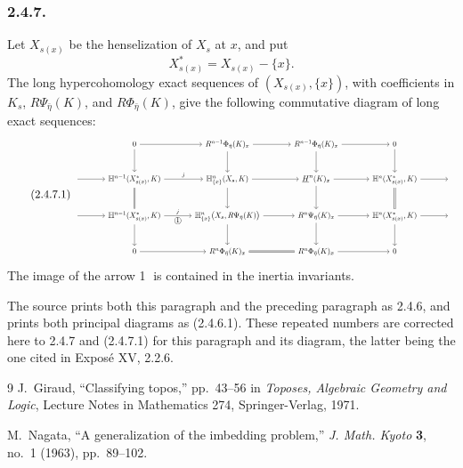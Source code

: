 \subsubsection*{2.4.7.}
Let $X_{s(x)}$ be the henselization of $X_s$ at $x$, and put
\[
X^*_{s(x)}=X_{s(x)}-\{x\}.
\]
The long hypercohomology exact sequences of
$(X_{s(x)},\{x\})$, with coefficients in $K_s$,
$R\Psi_{\bar\eta}(K)$, and $R\Phi_{\bar\eta}(K)$, give the following
commutative diagram of long exact sequences:
\begin{equation}\tag{2.4.7.1}
\resizebox{\textwidth}{!}{%
\begin{tikzcd}[ampersand replacement=\&, column sep=large, row sep=large]
{}
  \& 0 \arrow[r] \arrow[d]
  \& R^{n-1}\Phi_{\bar\eta}(K)_x \arrow[r] \arrow[d]
  \& R^{n-1}\Phi_{\bar\eta}(K)_x \arrow[r] \arrow[d]
  \& 0 \arrow[d]
  \& {} \\
{} \arrow[r]
  \& \mathbb H^{n-1}(X^*_{s(x)},K)
     \arrow[r, "j"] \arrow[d, equal]
  \& \mathbb H^n_{\{x\}}(X_s,K) \arrow[r] \arrow[d]
  \& \underline{H}^{n}(K)_x \arrow[r] \arrow[d]
  \& \mathbb H^n(X^*_{s(x)},K)
     \arrow[r] \arrow[d, equal]
  \& {} \\
{} \arrow[r]
  \& \mathbb H^{n-1}(X^*_{s(x)},K)
     \arrow[r, "j", "{\mbox{\textcircled{1}}}"'] \arrow[d]
  \& \mathbb H^n_{\{x\}}\bigl(X_s,R\Psi_{\bar\eta}(K)\bigr)
     \arrow[r] \arrow[d]
  \& R^n\Psi_{\bar\eta}(K)_x \arrow[r] \arrow[d]
  \& \mathbb H^n(X^*_{s(x)},K) \arrow[r] \arrow[d]
  \& {} \\
{}
  \& 0 \arrow[r]
  \& R^n\Phi_{\bar\eta}(K)_x \arrow[r, equal]
  \& R^n\Phi_{\bar\eta}(K)_x \arrow[r]
  \& 0
  \& {}
\end{tikzcd}}
\end{equation}
The image of the arrow \textcircled{1} is contained in the inertia
invariants.

The source prints both this paragraph and the preceding paragraph as
2.4.6, and prints both principal diagrams as (2.4.6.1).  These repeated
numbers are corrected here to 2.4.7 and (2.4.7.1) for this paragraph
and its diagram, the latter being the one cited in
Expos\'e XV, 2.2.6.

\renewcommand{\refname}{Bibliography}
\begin{thebibliography}{9}
J.~Giraud, ``Classifying topos,'' pp.~43--56 in
\emph{Toposes, Algebraic Geometry and Logic},
Lecture Notes in Mathematics 274, Springer-Verlag, 1971.

M.~Nagata, ``A generalization of the imbedding problem,''
\emph{J. Math. Kyoto} \textbf{3}, no.~1 (1963), pp.~89--102.
\end{thebibliography}
